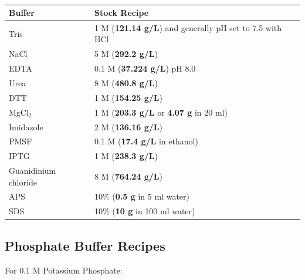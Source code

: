 \documentclass{tufte-book} %
\begin{document}
\begin{table}[ht]
  \centering
  \selectfont
  \begin{tabular}{ll}
    \toprule
    Buffer & Stock Recipe \\
    \midrule
    Tris				& 1 M (\textbf{121.14 g/L}) and generally pH set to 7.5 with HCl	 \\
    NaCl				& 5 M (\textbf{292.2 g/L})	\\
    EDTA				& 0.1 M (\textbf{37.224 g/L}) pH 8.0	\\
    Urea				& 8 M (\textbf{480.8 g/L})	\\
    DTT				& 1 M (\textbf{154.25 g/L})	\\
    MgCl$_{2}$			& 1 M (\textbf{203.3 g/L} or \textbf{4.07 g} in 20 ml)	\\
    Imidazole			& 2 M (\textbf{136.16 g/L}) \\
    PMSF				& 0.1 M (\textbf{17.4 g/L} in ethanol) \\
    IPTG				& 1 M (\textbf{238.3 g/L}) \\
    Guanidinium chloride 	& 8 M (\textbf{764.24 g/L}) \\
    APS				& 10\% (\textbf{0.5 g} in 5 ml water) \\
    SDS				& 10\% (\textbf{10 g} in 100 ml water) \\

    \bottomrule
  \end{tabular}
  \caption{}
  \label{tab:buffers}
\end{table}

\newpage

\subsection{Phosphate Buffer Recipes}

For 0.1 M Potassium Phosphate:
\end{document}
